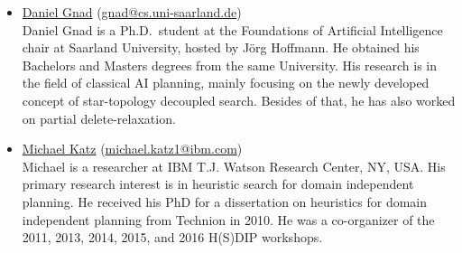 \documentclass[10pt]{article}
\begin{document}
\begin{itemize}




%

\item \href{http://}{Daniel Gnad}
  (\href{mailto:gnad@cs.uni-saarland.de}{gnad@cs.uni-saarland.de})\\
Daniel Gnad is a Ph.D.\ student at the Foundations of Artificial 
Intelligence chair at Saarland University, hosted by J\"org 
Hoffmann. He obtained his Bachelors and Masters degrees from the same 
University. His research is in the field of classical AI planning, 
mainly focusing on the newly developed concept of star-topology 
decoupled search. Besides of that, he has also worked on partial 
delete-relaxation.

\item \href{https://resedit.watson.ibm.com/researcher/view.php?person=ibm-Michael.Katz1}{Michael Katz}
 (\href{mailto:michael.katz1@ibm.com}{michael.katz1@ibm.com})\\
 Michael is a researcher at IBM T.J. Watson Research Center, NY, USA. His
 primary research interest is in heuristic search for domain independent planning.
 He received his PhD for a dissertation on heuristics for domain independent
 planning from Technion in 2010.
 He was a co-organizer of the 2011, 2013, 2014, 2015, and 2016 H(S)DIP
 workshops.


\end{itemize}
\end{document}
